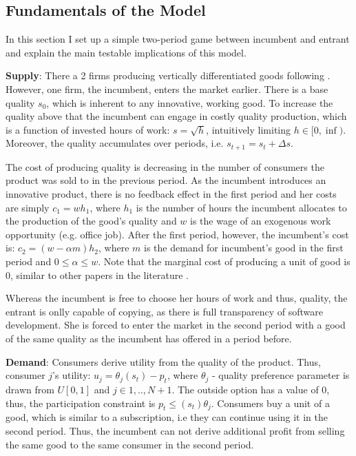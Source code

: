 \documentclass{article}
\numberwithin{figure}{section}
\numberwithin{table}{section}
\theoremstyle{indented}
\numberwithin{equation}{section} %
\begin{document}
\subsection{Fundamentals of the Model} \label{model}
 
 In this section I set up a simple two-period game between incumbent and entrant and explain the main testable implications of this model.

\textbf{Supply}:
There a 2 firms producing vertically differentiated goods following  \citet{Tirole}. However, one firm, the incumbent, enters the market earlier. There is a base quality $s_0$, which is inherent to any innovative, working good. To increase the quality above that the incumbent can engage in costly quality production, which is a function of invested hours of work: $s=\sqrt{h}$, intuitively limiting $h \in [0,\inf)$. Moreover, the quality accumulates over periods, i.e. $s_{t+1}=s_{t}+\Delta s$. 

The cost of producing quality is decreasing in the number of consumers the product was sold to in the previous period. As the incumbent introduces an innovative product, there is no feedback effect in the first period and her costs are simply $c_1= wh_1$, where $h_1$ is the number of hours the incumbent allocates to the production of the good's quality and $w$ is the wage of an exogenous work opportunity (e.g. office job). After the first period, however, the incumbent's cost is: $c_2= (w-\alpha m)h_2$, where $m$ is the demand for incumbent's good in the first period and $0\leq \alpha \leq w$. Note that the marginal cost of producing a unit of good is 0, similar to other papers in the literature \citep{Ajorlou2018}. 

Whereas the incumbent is free to choose her hours of work and thus, quality, the entrant is onlly capable of copying, as there is full transparency of software development.  She is forced to enter the market in the second period with a good of the same quality as the incumbent has offered in a period before.

\textbf{Demand}: 
Consumers derive utility from the quality of the product. Thus, consumer $j$'s utility: $u_j = \theta_j(s_t) - p_t$, where $\theta_j$ - quality preference parameter is drawn from $U[0,1]$ and $j\in{1,..,N+1}$. The outside option has a value of 0, thus, the participation constraint is $p_t\leq (s_t) \theta_j$. Consumers buy a unit of a good, which is similar to a subscription, i.e they can continue using it in the second period. Thus, the incumbent can not derive additional profit from selling the same good to the same consumer in the second period.
\end{document}
